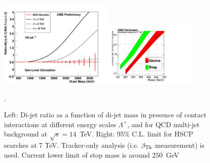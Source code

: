 \documentclass{cmspaper}
\begin{document}
\begin{figure}[htbp] 
\centering
\includegraphics[width=0.5\textwidth]{100pbOptFix.pdf}\includegraphics[width=0.4\textwidth]{HSCP1.pdf}  
\caption{Left: Di-jet ratio as a function of di-jet mass in presence of 
contact interactions at different energy scales $\Lambda^{+}$, 
and for QCD multi-jet background at $\sqrt{s} = 14$~TeV.  
Right: 95\% C.L. limit for HSCP searches at 7 TeV. Tracker-only analysis (i.e. $\beta_{{\rm Tk}}$ measurement) is used. 
Current lower limit of stop mass is around $250$~GeV~\cite{Abazov:2008quETAaltonen:2009kea}}.
\label{fig:DiJetRatioAndHSCP}
\end{figure}
\end{document}
